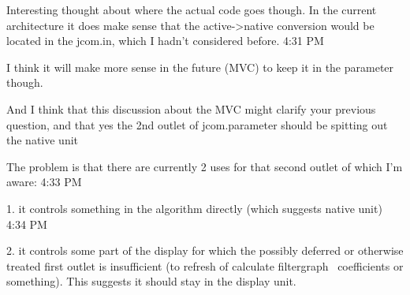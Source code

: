 \documentclass[]{article}
\begin{document}
Interesting thought about where the actual code goes though.  In the current architecture it does make sense that the active->native conversion would be located in the jcom.in, which I hadn't considered before.
4:31 PM
 
I think it will make more sense in the future (MVC) to keep it in the parameter though.

And I think that this discussion about the MVC might clarify your previous question, and that yes the 2nd outlet of jcom.parameter should be spitting out the native unit

The problem is that there are currently 2 uses for that second outlet of which I'm aware:
4:33 PM
 
1. it controls something in the algorithm directly (which suggests native unit)
4:34 PM
 
2. it controls some part of the display for which the possibly deferred or otherwise treated first outlet is insufficient (to refresh of calculate filtergraph~ coefficients or something).  This suggests it should stay in the display unit.







\end{document}

